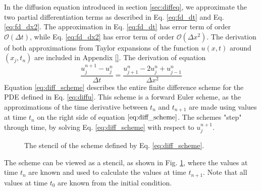 In the diffusion equation introduced in section \ref{sec:diffeq}, we approximate the two partial differentiation terms as described in Eq. \ref{eq:fd_dt} and Eq. \ref{eq:fd_dx2}.
The approximation in Eq. \ref{eq:fd_dt} has error term of order $\mathcal{O}(\Delta t)$, while Eq. \ref{eq:fd_dx2} has error term of order $\mathcal{O}(\Delta x^2)$.
The derivation of both approximations from Taylor expansions of the function $u(x, t)$ around $(x_j, t_n)$ are included in Appendix \ref{}.
The derivation of equation 
\begin{equation}
    \label{eq:diff_scheme}
    \frac{u_j^{n+1}-u_j^n}{\Delta t} = \frac{u_{j+1}^n - 2u_j^n + u_{j-1}^n}{\Delta x^2}
\end{equation}
Equation \ref{eq:diff_scheme} describes the entire finite difference scheme for the PDE defined in Eq. \ref{eq:diffu}.
This scheme is a forward Euler scheme, as the approximations of the time derivative between $t_n$ and $t_{n+1}$ are made using values at time $t_n$ on the right side of equation $\ref{eq:diff_scheme}$.
The schemes "step" through time, by solving Eq. \ref{eq:diff_scheme} with respect to $u_j^{n+1}$.
\begin{figure}[h]
        \centering
        
        \caption{The stencil of the scheme defined by Eq. \ref{eq:diff_scheme}.} 
        \label{fig:fd_stencil}  
    \end{figure}
The scheme can be viewed as a stencil, as shown in Fig. \ref{fig:fd_stencil}, where the values at time $t_n$ are known and used to calculate the values at time $t_{n+1}$.
Note that all values at time $t_0$ are known from the initial condition.
